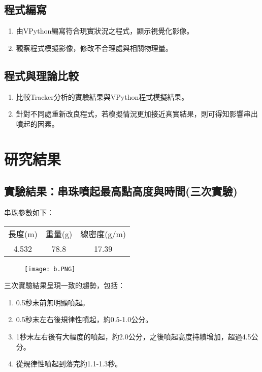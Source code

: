 \documentclass[11pt,twoside,b5paper]{article}
\begin{document}
\subsection{程式編寫}
    \begin{enumerate}
        \item 由VPython編寫符合現實狀況之程式，顯示視覺化影像。
        \item 觀察程式模擬影像，修改不合理處與相關物理量。
    \end{enumerate}
\subsection{程式與理論比較}
\begin{enumerate}
    \item 比較Tracker分析的實驗結果與VPython程式模擬結果。
    \item 針對不同處重新改良程式，若模擬情況更加接近真實結果，則可得知影響串出噴起的因素。
\end{enumerate}

\section{研究結果}

\subsection{實驗結果：串珠噴起最高點高度與時間(三次實驗)}

串珠參數如下：
\begin{table}[H]
    \centering
    \begin{tabular}{c|c|c}
    長度(m) & 重量(g) & 線密度(g/m) \\
    4.532 & 78.8 & 17.39
    \end{tabular}
\end{table}

\begin{figure}[H]
    \centering
    \texttt{[image: b.PNG]}
\end{figure}

三次實驗結果呈現一致的趨勢，包括：

\begin{enumerate}
    \item 0.5秒末前無明顯噴起。
    \item 0.5秒末左右後規律性噴起，約0.5-1.0公分。
    \item 1秒末左右後有大幅度的噴起，約2.0公分，之後噴起高度持續增加，超過4.5公分。
    \item 從規律性噴起到落完約1.1-1.3秒。
\end{enumerate}
\end{document}
